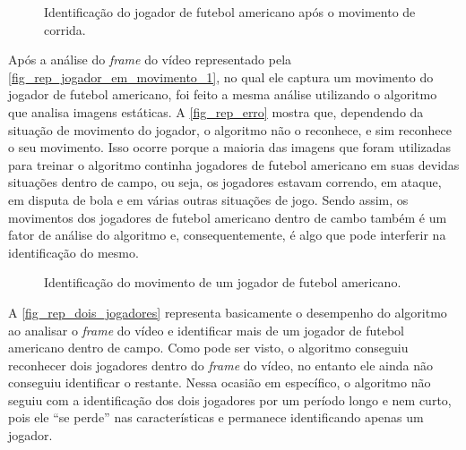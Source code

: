 
\begin{figure}[ht]
	\caption{\label{fig_rep_jogador_em_movimento_2}Identificação do jogador de futebol americano após o movimento de corrida.}
	\begin{center}
	\end{center}
	\centering {}
\end{figure}

Após a análise do \textit{frame} do vídeo representado pela \autoref{fig_rep_jogador_em_movimento_1}, no qual ele captura um movimento do jogador de futebol americano, foi feito a mesma análise utilizando o algoritmo que analisa imagens estáticas. A \autoref{fig_rep_erro} mostra que, dependendo da situação de movimento do jogador, o algoritmo não o reconhece, e sim reconhece o seu movimento. Isso ocorre porque a maioria das imagens que foram utilizadas para treinar o algoritmo continha jogadores de futebol americano em suas devidas situações dentro de campo, ou seja, os jogadores estavam correndo, em ataque, em disputa de bola e em várias outras situações de jogo. Sendo assim, os movimentos dos jogadores de futebol americano dentro de cambo também é um fator de análise do algoritmo e, consequentemente, é algo que pode interferir na identificação do mesmo.

\begin{figure}[ht]
	\caption{\label{fig_rep_erro}Identificação do movimento de um jogador de futebol americano.}
	\begin{center}
	\end{center}
	\centering {}
\end{figure}


A \autoref{fig_rep_dois_jogadores} representa basicamente o desempenho do algoritmo ao analisar o \textit{frame} do vídeo e identificar mais de um jogador de futebol americano dentro de campo. Como pode ser visto, o algoritmo conseguiu reconhecer dois jogadores dentro do \textit{frame} do vídeo, no entanto ele ainda não conseguiu identificar o restante. Nessa ocasião em específico, o algoritmo não seguiu com a identificação dos dois jogadores por um período longo e nem curto, pois ele “se perde” nas características e permanece identificando apenas um jogador.

